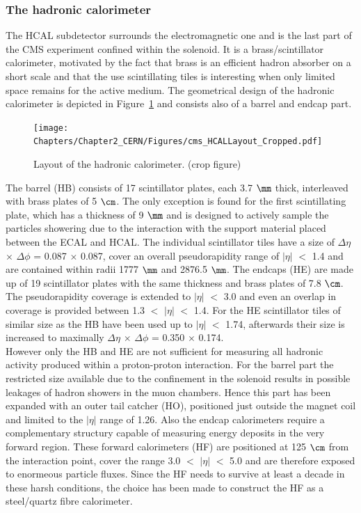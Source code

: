 \subsubsection{The hadronic calorimeter}
The HCAL subdetector surrounds the electromagnetic one and is the last part of the CMS experiment confined within the solenoid.
It is a brass/scintillator calorimeter, motivated by the fact that brass is an efficient hadron absorber on a short scale and that the use scintillating tiles is interesting when only limited space remains for the active medium. The geometrical design of the hadronic calorimeter is depicted in Figure~\ref{fig::HCAL} and consists also of a barrel and endcap part.
\begin{figure}[h!t]
 \centering
 \texttt{[image: Chapters/Chapter2\_CERN/Figures/cms\_HCALLayout\_Cropped.pdf]}
 \caption{Layout of the hadronic calorimeter. (crop figure)} \label{fig::HCAL}
\end{figure}

The barrel (HB) consists of 17 scintillator plates, each 3.7 $\mm$ thick, interleaved with brass plates of 5 $\cm$. The only exception is found for the first scintillating plate, which has a thickness of 9 $\mm$ and is designed to actively sample the particles showering due to the interaction with the support material placed between the ECAL and HCAL. The individual scintillator tiles have a size of $\Delta \eta$ $\times$ $\Delta \phi$ = 0.087 $\times$ 0.087, cover an overall pseudorapidity range of $\vert \eta \vert$ $<$ 1.4 and are contained within radii 1777 $\mm$ and 2876.5 $\mm$. The endcaps (HE) are made up of 19 scintillator plates with the same thickness and brass plates of 7.8 $\cm$. The pseudorapidity coverage is extended to $\vert \eta \vert$ $<$ 3.0 and even an overlap in coverage is provided between 1.3 $<$ $\vert \eta \vert$ $<$ 1.4. For the HE scintillator tiles of similar size as the HB have been used up to $\vert \eta \vert$ $<$ 1.74, afterwards their size is increased to maximally $\Delta \eta$ $\times$ $\Delta \phi$ = 0.350 $\times$ 0.174.
\\
However only the HB and HE are not sufficient for measuring all hadronic activity produced within a proton-proton interaction. 
For the barrel part the restricted size available due to the confinement in the solenoid results in possible leakages of hadron showers in the muon chambers.
Hence this part has been expanded with an outer tail catcher (HO), positioned just outside the magnet coil and limited to the $\vert \eta \vert$ range of 1.26. Also the endcap calorimeters require a complementary structury capable of measuring energy deposits in the very forward region. These forward calorimeters (HF) are positioned at 125 $\cm$ from the interaction point, cover the range 3.0 $<$ $\vert \eta \vert$ $<$ 5.0 and are therefore exposed to enormeous particle fluxes. Since the HF needs to survive at least a decade in these harsh conditions, the choice has been made to construct the HF as a steel/quartz fibre calorimeter.

